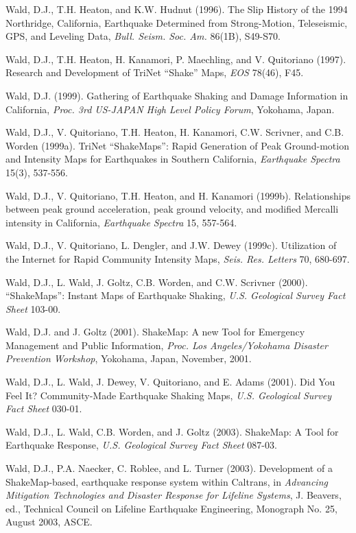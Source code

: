 \documentclass[letterpaper,10pt,english]{sphinxmanual}
\begin{document}
\label{references:wald1996}
Wald, D.J., T.H. Heaton, and K.W. Hudnut (1996). The Slip History of the 1994 Northridge,
California, Earthquake Determined from Strong-Motion, Teleseismic, GPS, and Leveling
Data, \emph{Bull. Seism. Soc. Am.} 86(1B), S49-S70.

Wald, D.J., T.H. Heaton, H. Kanamori, P. Maechling, and V. Quitoriano (1997). Research and
Development of TriNet ``Shake'' Maps, \emph{EOS} 78(46), F45.

Wald, D.J. (1999).  Gathering of Earthquake Shaking and Damage Information in California,
\emph{Proc. 3rd US-JAPAN High Level Policy Forum}, Yokohama, Japan.

\label{references:wald1999a}
Wald, D.J., V. Quitoriano, T.H. Heaton, H. Kanamori, C.W. Scrivner, and C.B. Worden (1999a).
TriNet ``ShakeMaps'': Rapid Generation of Peak Ground-motion and Intensity Maps for Earthquakes in
Southern California, \emph{Earthquake Spectra} 15(3), 537-556.

\label{references:wald1999b}
Wald, D.J., V. Quitoriano, T.H. Heaton, and H. Kanamori (1999b). Relationships between peak ground
acceleration, peak ground velocity, and modified Mercalli intensity in California, \emph{Earthquake
Spectra} 15, 557-564.

Wald, D.J., V. Quitoriano, L. Dengler, and J.W. Dewey (1999c). Utilization of the Internet
for Rapid Community Intensity Maps, \emph{Seis. Res. Letters} 70, 680-697.

Wald, D.J., L. Wald, J. Goltz, C.B. Worden, and C.W. Scrivner (2000). ``ShakeMaps'': Instant Maps of
Earthquake Shaking, \emph{U.S. Geological Survey Fact Sheet} 103-00.

Wald, D.J. and J. Goltz (2001). ShakeMap: A new Tool for Emergency Management and Public
Information, \emph{Proc. Los Angeles/Yokohama Disaster Prevention Workshop}, Yokohama,
Japan, November, 2001.

Wald, D.J., L. Wald, J. Dewey, V. Quitoriano, and E. Adams (2001). Did You Feel It? Community-Made
Earthquake Shaking Maps, \emph{U.S. Geological Survey Fact Sheet} 030-01.

Wald, D.J., L. Wald, C.B. Worden, and J. Goltz (2003). ShakeMap: A Tool for Earthquake Response, \emph{U.S.
Geological Survey Fact Sheet} 087-03.

Wald, D.J., P.A. Naecker, C. Roblee, and L. Turner (2003). Development of a ShakeMap-based,
earthquake response system within Caltrans, in \emph{Advancing Mitigation Technologies and Disaster
Response for Lifeline Systems}, J. Beavers, ed., Technical Council on Lifeline Earthquake Engineering,
Monograph No. 25, August 2003, ASCE.
\end{document}
